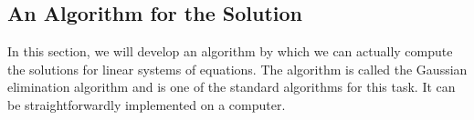 



\subsection{An Algorithm for the Solution}
In this section, we will develop an algorithm by which we can actually compute the solutions for linear systems of equations. The algorithm is called the Gaussian elimination algorithm and is one of the standard algorithms for this task. It can be straightforwardly implemented on a computer.

